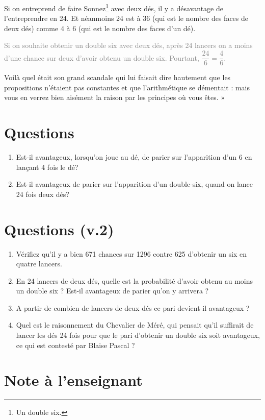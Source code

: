 \documentclass[frenchb]{article}
\begin{document}
Si on entreprend de faire Sonnez\footnote{Un double six.} avec deux dés, il y a désavantage de l'entreprendre en 24.
Et néanmoins 24 est à 36 (qui est le nombre des faces de deux dés) comme 4 à 6 (qui est le
nombre des faces d'un dé).

\textcolor{gray}{Si on souhaite obtenir un double six avec deux dés, après 24 lancers on a moins d’une
chance sur deux d’avoir obtenu un double six. Pourtant, $\dfrac{24}{6}= \dfrac{4}{6}$. }

 Voilà quel était son grand scandale qui lui faisait dire hautement que les propositions n'étaient pas constantes et que l'arithmétique se démentait : mais vous en verrez bien aisément la raison par les principes où vous êtes. »

\section*{Questions}
\begin{enumerate}
\item Est-il avantageux, lorsqu'on joue au dé, de parier sur l'apparition d'un 6 en lançant 4 fois le
dé?
\item Est-il avantageux de parier sur l'apparition d'un double-six, quand on lance 24 fois deux
dés?
\end{enumerate}
\section*{Questions (v.2)}
\begin{enumerate}
\item Vérifiez qu'il y a bien 671 chances sur 1296 contre 625 d'obtenir un six en quatre lancers. 
\item En 24 lancers de deux dés, quelle est la probabilité d'avoir obtenu au moins un double six ? Est-il avantageux de parier qu'on y arrivera ?
\item A partir de combien de lancers de deux dés ce pari devient-il avantageux ?
\item Quel est le raisonnement du Chevalier de Méré, qui pensait qu'il suffirait de lancer les dés 24 fois pour que le pari d'obtenir un double six soit avantageux, ce qui est contesté par Blaise Pascal ?
\end{enumerate}

\section*{Note à l'enseignant}
\end{document}
